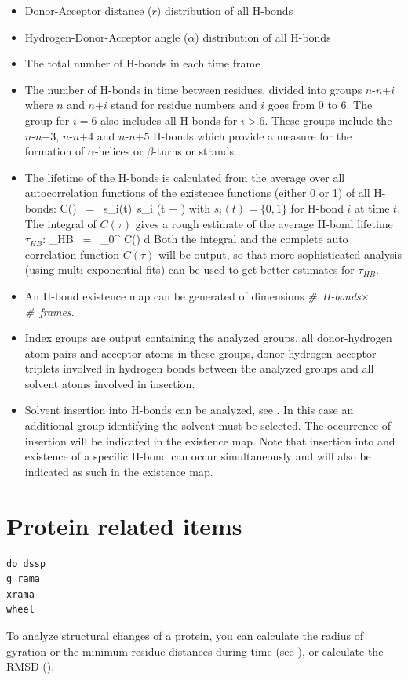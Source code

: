 \begin{itemize}
\item
Donor-Acceptor distance ($r$) distribution of all H-bonds
\item
Hydrogen-Donor-Acceptor angle ($\alpha$) distribution of all H-bonds 
\item
The total number of H-bonds in each time frame
\item
\newcommand{\nn}[1]{$n$-$n$+$#1$}
The number of H-bonds in time between residues, divided into groups
\nn{i} where $n$ and $n$+$i$ stand for residue numbers and $i$ goes
from 0 to 6. The group for $i=6$ also includes all H-bonds for
$i>6$. These groups include the \nn{3}, \nn{4} and \nn{5} H-bonds
which provide a measure for the formation of $\alpha$-helices or
$\beta$-turns or strands.
\item
The lifetime of the H-bonds is calculated from the average over all
autocorrelation functions of the existence functions (either 0 or 1)
of all H-bonds:
\beq
C(\tau) ~=~ \langle s_i(t)~s_i (t + \tau) \rangle
\label{eqn:hbcorr}
\eeq
with $s_i(t) = \{0,1\}$ for H-bond $i$ at time $t$. The integral of
$C(\tau)$ gives a rough estimate of the average H-bond lifetime
$\tau_{HB}$:
\beq
\tau_{HB} ~=~ \int_{0}^{\infty} C(\tau) d\tau
\label{eqn:hblife}
\eeq
Both the integral and the complete auto correlation function $C(\tau)$
will be output, so that more sophisticated analysis ({\eg}\@ using
multi-exponential fits) can be used to get better estimates for
$\tau_{HB}$.
\item
An H-bond existence map can be generated of dimensions {\em
\#~H-bonds}$\times${\em \#~frames}.
\item
Index groups are output containing the analyzed groups, all
donor-hydrogen atom pairs and acceptor atoms in these groups,
donor-hydrogen-acceptor triplets involved in hydrogen bonds between
the analyzed groups and all solvent atoms involved in insertion.
\item
Solvent insertion into H-bonds can be analyzed, see
. In this case an additional group identifying
the solvent must be selected. The occurrence of insertion will be
indicated in the existence map. Note that insertion into and existence
of a specific H-bond can occur simultaneously and will also be
indicated as such in the existence map.
\end{itemize}

%

\section{Protein related items}
\begin{verbatim}
do_dssp
g_rama
xrama
wheel
\end{verbatim}
To analyze structural changes of a protein, you can calculate the radius of 
gyration or the minimum residue distances during time 
(see ), or calculate the RMSD ().

